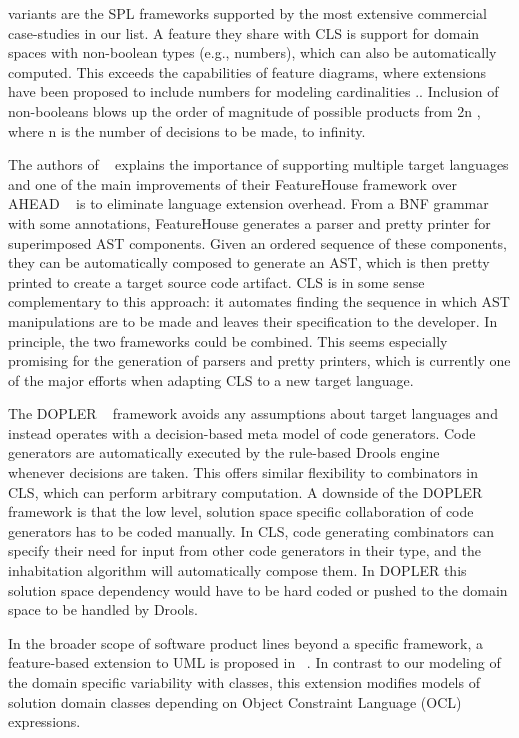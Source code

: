 variants are the SPL frameworks supported by the most extensive commercial case-studies in our list. A feature they
share with CLS is support for domain spaces with non-boolean types (e.g., numbers), which can also be automatically
computed. This exceeds the capabilities of feature diagrams, where extensions have been proposed to include numbers for
modeling cardinalities .\cite{Sousa:2016:EFM:2934466.2934475}. Inclusion of non-booleans blows up
 the order of magnitude of possible products from 2n , where n is the number of decisions to be made, to infinity.

The authors of ~\cite{Apel:2009:FLA:1555001.1555038} explains the importance of supporting multiple target languages and one of the main improvements of
their FeatureHouse framework over AHEAD ~\cite{Batory2004FeatureorientedPA} is to eliminate language extension overhead. From a BNF grammar with some
annotations, FeatureHouse generates a parser and pretty printer for superimposed AST components. Given an ordered
sequence of these components, they can be automatically composed to generate an AST, which is then pretty printed
to create a target source code artifact. CLS is in some sense complementary to this approach: it automates finding the
sequence in which AST manipulations are to be made and leaves their specification to the developer. In principle, the
two frameworks could be combined. This seems especially promising for the generation of parsers and pretty printers,
which is currently one of the major efforts when adapting CLS to a new target language.

The DOPLER ~\cite{Dhungana:2011:DMD:1924082.1924092} framework avoids any assumptions about target languages and instead
 operates with a decision-based meta model of code generators. Code generators are automatically executed by the
 rule-based Drools engine ~\cite{DBLP:conf/agtive/2007} whenever decisions are taken. This offers similar flexibility to combinators in CLS,
 which can perform arbitrary computation. A downside of the DOPLER framework is that the low level, solution space
 specific collaboration of code generators has to be coded manually. In CLS, code generating combinators can specify
 their need for input from other code generators in their type, and the inhabitation algorithm will automatically
 compose them. In DOPLER this solution space dependency would have to be hard coded or pushed to the domain space
 to be handled by Drools.


In the broader scope of software product lines beyond a specific framework, a feature-based extension to UML
is proposed in ~\cite{Czarnecki:2006:VFM:1173706.1173738}. In contrast to our modeling of the domain specific
variability with classes, this extension modifies models of solution domain classes depending on Object Constraint
Language (OCL) expressions.

